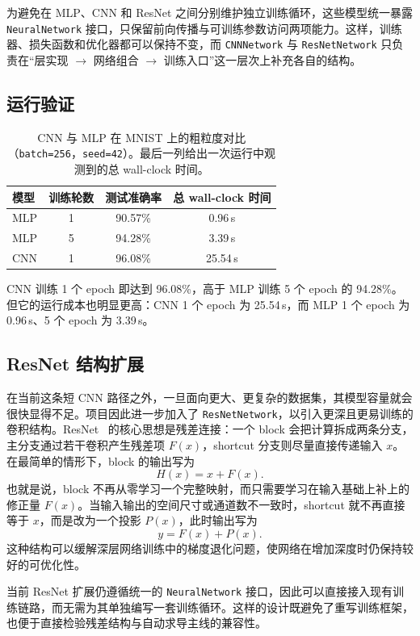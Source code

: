 \documentclass[a4paper,11pt,oneside]{article}
\begin{document}
为避免在 MLP、CNN 和 ResNet 之间分别维护独立训练循环，这些模型统一暴露 \texttt{NeuralNetwork} 接口，只保留前向传播与可训练参数访问两项能力。这样，训练器、损失函数和优化器都可以保持不变，而 \texttt{CNNNetwork} 与 \texttt{ResNetNetwork} 只负责在“层实现 $\rightarrow$ 网络组合 $\rightarrow$ 训练入口”这一层次上补充各自的结构。

\subsection{运行验证}

\begin{table}[h]
\centering
\begin{tabular}{lccc}
\hline
模型 & 训练轮数 & 测试准确率 & 总 wall-clock 时间 \\
\hline
MLP & 1 & 90.57\% & 0.96\,s \\
MLP & 5 & 94.28\% & 3.39\,s \\
CNN & 1 & 96.08\% & 25.54\,s \\
\hline
\end{tabular}
\caption{CNN 与 MLP 在 MNIST 上的粗粒度对比（\texttt{batch=256}，\texttt{seed=42}）。最后一列给出一次运行中观测到的总 wall-clock 时间。}
\label{tab:cnn_mlp_acc}
\end{table}

CNN 训练 1 个 epoch 即达到 96.08\%，高于 MLP 训练 5 个 epoch 的 94.28\%。但它的运行成本也明显更高：CNN 1 个 epoch 为 25.54\,s，而 MLP 1 个 epoch 为 0.96\,s、5 个 epoch 为 3.39\,s。

\subsection{ResNet 结构扩展}

在当前这条短 CNN 路径之外，一旦面向更大、更复杂的数据集，其模型容量就会很快显得不足。项目因此进一步加入了 \texttt{ResNetNetwork}，以引入更深且更易训练的卷积结构。ResNet~\cite{he2016resnet} 的核心思想是残差连接：一个 block 会把计算拆成两条分支，主分支通过若干卷积产生残差项 $F(x)$，shortcut 分支则尽量直接传递输入 $x$。在最简单的情形下，block 的输出写为
\[
H(x) = x + F(x).
\]
也就是说，block 不再从零学习一个完整映射，而只需要学习在输入基础上补上的修正量 $F(x)$。当输入输出的空间尺寸或通道数不一致时，shortcut 就不再直接等于 $x$，而是改为一个投影 $P(x)$，此时输出写为
\[
y = F(x) + P(x).
\]
这种结构可以缓解深层网络训练中的梯度退化问题，使网络在增加深度时仍保持较好的可优化性。

当前 ResNet 扩展仍遵循统一的 \texttt{NeuralNetwork} 接口，因此可以直接接入现有训练链路，而无需为其单独编写一套训练循环。这样的设计既避免了重写训练框架，也便于直接检验残差结构与自动求导主线的兼容性。
\end{document}
